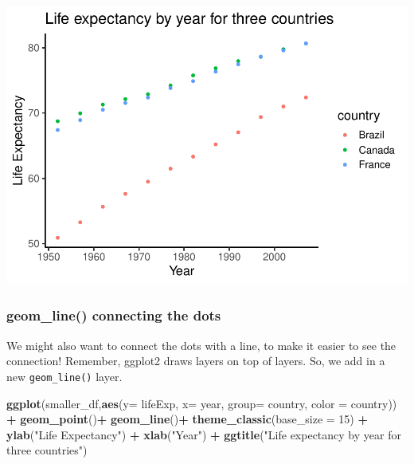 \documentclass[
]{book}
\newenvironment{Shaded}{\begin{snugshade}}{\end{snugshade}}
\newcommand{\AttributeTok}[1]{\textcolor[rgb]{0.13,0.29,0.53}{#1}}
\newcommand{\DecValTok}[1]{\textcolor[rgb]{0.00,0.00,0.81}{#1}}
\newcommand{\FunctionTok}[1]{\textcolor[rgb]{0.13,0.29,0.53}{\textbf{#1}}}
\newcommand{\NormalTok}[1]{#1}
\newcommand{\SpecialCharTok}[1]{\textcolor[rgb]{0.81,0.36,0.00}{\textbf{#1}}}
\newcommand{\StringTok}[1]{\textcolor[rgb]{0.31,0.60,0.02}{#1}}
\begin{document}
\includegraphics{Statistics_Lab_files/figure-latex/1scatterD-1.pdf}

\hypertarget{geom_line-connecting-the-dots}{%
\subsubsection{geom\_line() connecting the dots}\label{geom_line-connecting-the-dots}}

We might also want to connect the dots with a line, to make it easier to see the connection! Remember, ggplot2 draws layers on top of layers. So, we add in a new \texttt{geom\_line()} layer.

\begin{Shaded}
\begin{Highlighting}[]
\FunctionTok{ggplot}\NormalTok{(smaller\_df,}\FunctionTok{aes}\NormalTok{(}\AttributeTok{y=}\NormalTok{ lifeExp, }\AttributeTok{x=}\NormalTok{ year, }
                      \AttributeTok{group=}\NormalTok{ country, }\AttributeTok{color =}\NormalTok{ country)) }\SpecialCharTok{+}
  \FunctionTok{geom\_point}\NormalTok{()}\SpecialCharTok{+} 
  \FunctionTok{geom\_line}\NormalTok{()}\SpecialCharTok{+}
  \FunctionTok{theme\_classic}\NormalTok{(}\AttributeTok{base\_size =} \DecValTok{15}\NormalTok{) }\SpecialCharTok{+}
  \FunctionTok{ylab}\NormalTok{(}\StringTok{"Life Expectancy"}\NormalTok{) }\SpecialCharTok{+} 
  \FunctionTok{xlab}\NormalTok{(}\StringTok{"Year"}\NormalTok{) }\SpecialCharTok{+}
  \FunctionTok{ggtitle}\NormalTok{(}\StringTok{"Life expectancy by year for three countries"}\NormalTok{)}
\end{Highlighting}
\end{Shaded}
\end{document}
